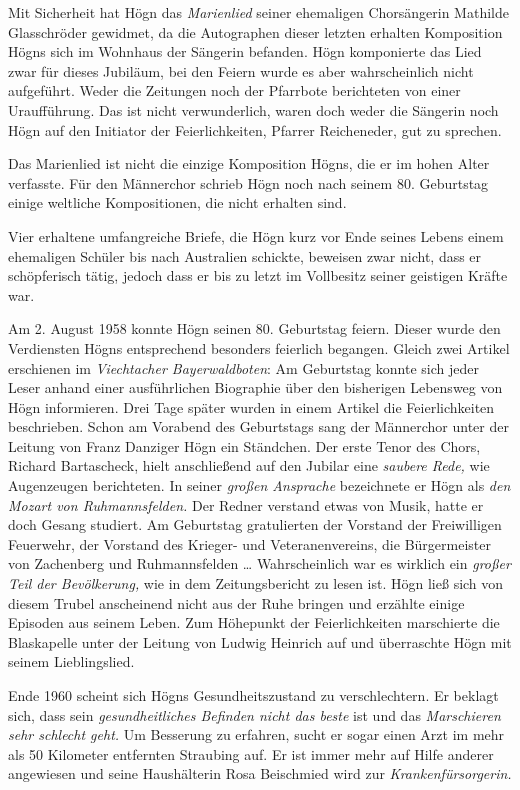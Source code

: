 \documentclass{book}
\newcommand{\zitat}[1]{\textit{#1}}
\begin{document}
Mit Sicherheit hat Högn das \textit{Marienlied} seiner ehemaligen
Chorsängerin Mathilde Glasschröder gewidmet, da die Autographen dieser
letzten erhalten Komposition Högns sich im Wohnhaus der Sängerin
befanden. Högn kom\-ponierte das Lied zwar für dieses Jubiläum, bei den
Feiern wurde es aber wahrscheinlich nicht aufgeführt. Weder die
Zeitungen noch der Pfarrbote be\-richteten von einer Uraufführung. Das
ist nicht verwunderlich, waren doch weder die Sängerin noch Högn auf
den Initiator der Feierlichkeiten, Pfarrer Reicheneder, gut zu
sprechen.

Das Marienlied ist nicht die einzige Komposition Högns, die er im hohen
Alter verfasste. Für den Männerchor schrieb Högn noch nach seinem 80.
Ge\-burtstag einige weltliche Kompositionen, die nicht erhalten sind.

Vier erhaltene umfangreiche Briefe, die Högn kurz vor Ende seines
Le\-bens einem ehemaligen Schüler bis nach Australien schickte,
beweisen zwar nicht, dass er schöpferisch tätig, jedoch dass er bis zu
letzt im Vollbesitz seiner geistigen Kräfte war.

Am 2. August 1958 konnte Högn seinen 80. Geburtstag feiern. Dieser wurde
den Verdiensten Högns entsprechend besonders feierlich begangen. Gleich
zwei Artikel erschienen im \textit{Viechtacher Bayerwaldboten}: Am
Geburtstag konnte sich jeder Leser anhand einer ausführlichen
Biographie über den bisherigen Lebensweg von Högn informieren. Drei
Tage später wurden in einem Artikel die Feierlichkeiten beschrieben.
Schon am Vorabend des Geburtstags sang der Männerchor unter der Leitung
von Franz Danziger Högn ein Ständ\-chen. Der erste Tenor des Chors,
Richard Bartascheck, hielt anschließend auf den Jubilar eine
\textit{saubere Rede,} wie Augenzeugen berichteten. In seiner
\textit{großen Ansprache} bezeichnete er Högn als \textit{den Mozart
von Ruhmannsfelden.} Der Redner verstand etwas von Musik, hatte er doch
Gesang studiert. Am Geburtstag gratulierten der Vorstand der
Freiwilligen Feuerwehr, der Vorstand des Krie\-ger- und
Veteranenvereins, die Bürgermeister von Zachenberg und Ruh\-mannsfelden
… Wahrscheinlich war es wirklich ein \textit{großer Teil der
Bevölkerung,} wie in dem Zeitungsbericht zu lesen ist. Högn ließ sich
von diesem Trubel an\-scheinend nicht aus der Ruhe bringen und erzählte
einige Episoden aus sei\-nem Leben. Zum Höhepunkt der Feierlichkeiten
marschierte die Blaskapelle unter der Leitung von Ludwig Heinrich auf
und überraschte Högn mit seinem Lieblingslied.

Ende 1960 scheint sich Högns Gesundheitszustand zu verschlechtern. Er
beklagt sich, dass sein \zitat{gesundheitliches Befinden
nicht das beste} ist und das \zitat{Marschie\-ren sehr
schlecht geht.} Um Besserung zu erfahren, sucht er sogar einen Arzt im
mehr als 50 Kilometer entfernten Straubing auf. Er ist immer mehr auf
Hilfe anderer angewiesen und seine Haushälterin Rosa Beischmied wird
zur \zitat{Kran\-kenfürsorgerin.}
\end{document}
